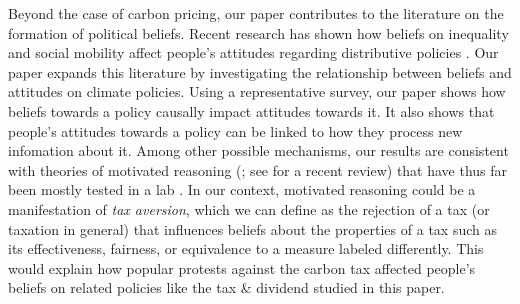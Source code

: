 \documentclass[12pt]{article} %
\begin{document}
Beyond the case of carbon pricing, our paper contributes to the literature on the formation of political beliefs. Recent research has shown how beliefs on inequality and social mobility affect people's attitudes regarding distributive policies \citep[e.g.,][]{cruces_et_al_2013,kuziemko_et_al_2015,alesina_intergenerational_2018}. Our paper expands this literature by investigating the relationship between beliefs and attitudes on climate policies. Using a representative survey, our paper shows how beliefs towards a policy causally impact attitudes towards it. It also shows that people's attitudes towards a policy can be linked to how they process new infomation about it. Among other possible mechanisms, our results are consistent with theories of motivated reasoning (\citet{ziva_kunda_case_1990}; see \citet{benabou_mindful_2016} for a recent review) that have thus far been mostly tested in a lab \citep[e.g.,][]{redlawsk_hot_2002,thaler_2019}. In our context, motivated reasoning could be a manifestation of \textit{tax aversion}, which we can define as the rejection of a tax (or taxation in general) that influences beliefs about the properties of a tax such as its effectiveness, fairness, or equivalence to a measure labeled differently. This would explain how popular protests against the carbon tax affected people's beliefs on related policies like the tax \& dividend studied in this paper.
\end{document}
